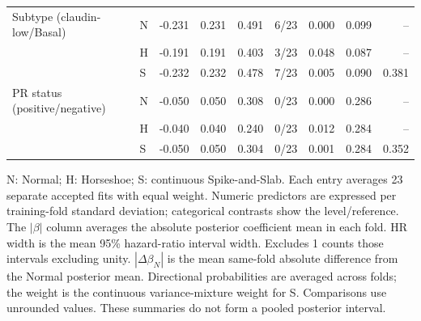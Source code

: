 \begin{longtable}{@{}>{\raggedright\arraybackslash}p{}lrrrrrrr@{}}
Subtype (claudin-low/Basal) & N & -0.231 & 0.231 & 0.491 & 6/23 & 0.000 & 0.099 & --\\*
 & H & -0.191 & 0.191 & 0.403 & 3/23 & 0.048 & 0.087 & --\\*
 & S & -0.232 & 0.232 & 0.478 & 7/23 & 0.005 & 0.090 & 0.381\\[2pt]
PR status (positive/negative) & N & -0.050 & 0.050 & 0.308 & 0/23 & 0.000 & 0.286 & --\\*
 & H & -0.040 & 0.040 & 0.240 & 0/23 & 0.012 & 0.284 & --\\*
 & S & -0.050 & 0.050 & 0.304 & 0/23 & 0.001 & 0.284 & 0.352\\[2pt]
\end{longtable}
\noindent\begin{minipage}{\textwidth}
N: Normal; H: Horseshoe; S: continuous Spike-and-Slab. Each entry averages 23 separate accepted fits with equal weight. Numeric predictors are expressed per training-fold standard deviation; categorical contrasts show the level/reference. The $|\beta|$ column averages the absolute posterior coefficient mean in each fold. HR width is the mean 95\% hazard-ratio interval width. Excludes 1 counts those intervals excluding unity. $|\Delta\beta_N|$ is the mean same-fold absolute difference from the Normal posterior mean. Directional probabilities are averaged across folds; the weight is the continuous variance-mixture weight for S. Comparisons use unrounded values. These summaries do not form a pooled posterior interval.
\end{minipage}\endgroup
